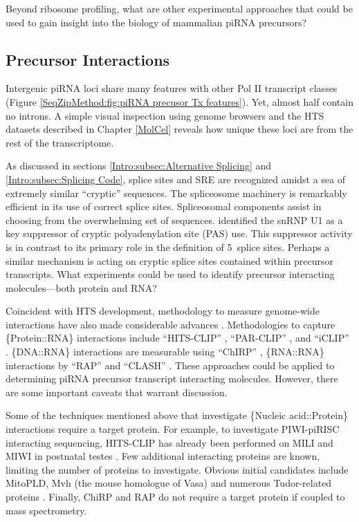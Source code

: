     Beyond ribosome profiling, what are other experimental approaches that could be used to gain insight into the biology of mammalian piRNA precursors?

  \subsection{Precursor Interactions}
    \label{Disc:subsec:Labeling of precursors}


    Intergenic piRNA loci share many features with other Pol II transcript classes (Figure \ref{SeqZipMethod:fig:piRNA precusor Tx features}). Yet, almost half contain no introns. A simple visual inspection using genome browsers and the HTS datasets described in Chapter \ref{MolCel} reveals how unique these loci are from the rest of the transcriptome.

    As discussed in sections \ref{Intro:subsec:Alternative Splicing} and \ref{Intro:subsec:Splicing Code}, splice sites and SRE are recognized amidst a sea of extremely similar ``cryptic'' sequences. The spliceosome machinery is remarkably efficient in its use of correct splice sites. Spliceosomal components assist in choosing from the overwhelming set of sequences. \citet{Berg2012} identified the snRNP U1 as a key suppressor of cryptic polyadenylation site (PAS) use. This suppressor activity is in contrast to its primary role in the definition of 5\textprime~splice sites. Perhaps a similar mechanism is acting on cryptic splice sites contained within precursor transcripts. What experiments could be used to identify precursor interacting molecules---both protein and RNA?

    Coincident with HTS development, methodology to measure genome-wide interactions have also made considerable advances \citep{Konig2011}. Methodologies to capture \{Protein::RNA\} interactions include ``HITS-CLIP'' \citep{Licatalosi2008}, ``PAR-CLIP'' \citep{Hafner2010}, and ``iCLIP'' \citep{Konig2010}. \{DNA::RNA\} interactions are measurable using ``ChIRP'' \citep{Chu2012}, \{RNA::RNA\} interactions by ``RAP'' and ``CLASH'' \citep{Engreitz2013,Helwak2014}. These approaches could be applied to determining piRNA precursor transcript interacting molecules. However, there are some important caveats that warrant discussion.

    Some of the techniques mentioned above that investigate \{Nucleic acid::Protein\} interactions require a target protein. For example, to investigate PIWI-piRISC interacting sequencing, HITS-CLIP has already been performed on MILI and MIWI in postnatal testes \citep{Vourekas2012}. Few additional interacting proteins are known, limiting the number of proteins to investigate. Obvious initial candidates include MitoPLD, Mvh \citep{Lasko2013} (the mouse homologue of Vasa) and numerous Tudor-related proteins \citep{Chen2011}. Finally, ChiRP and RAP do not require a target protein if coupled to mass spectrometry.

